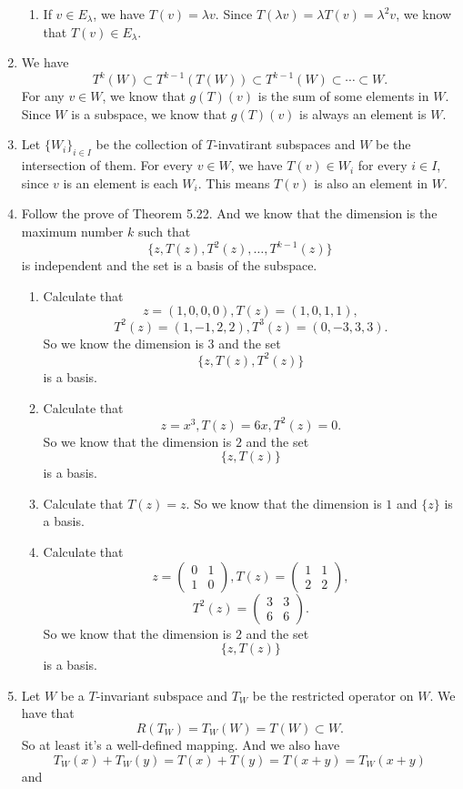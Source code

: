 \begin{enumerate}
\begin{enumerate}
\item If $v\in E_{\lambda}$, we have $T(v)=\lambda v$. Since $T(\lambda v)=\lambda T(v)=\lambda^2 v$, we know that $T(v)\in E_{\lambda}$.
\end{enumerate}
\item We have 
\[T^k(W)\subset T^{k-1}(T(W))\subset T^{k-1}(W)\subset \cdots \subset W.\]
For any $v\in W$, we know that $g(T)(v)$ is the sum of some elements in $W$. Since $W$ is a subspace, we know that $g(T)(v)$ is always an element is $W$.
\item Let $\{W_i\}_{i\in I}$ be the collection of $T$-invatirant subspaces and $W$ be the intersection of them. For every $v\in W$, we have $T(v)\in W_i$ for every $i\in I$, since $v$ is an element is each $W_i$. This means $T(v)$ is also an element in $W$.
\item Follow the prove of Theorem 5.22. And we know that the dimension is the maximum number $k$ such that 
\[\{z,T(z),T^2(z),\ldots ,T^{k-1}(z)\}\]
is independent and the set is a basis of the subspace.
\begin{enumerate}
\item Calculate that 
\[z=(1,0,0,0), T(z)=(1,0,1,1),\]
\[T^2(z)=(1,-1,2,2), T^3(z)=(0,-3,3,3).\]
So we know the dimension is $3$ and the set
\[\{z,T(z),T^2(z)\}\]
is a basis.
\item Calculate that
\[z=x^3,T(z)=6x,T^2(z)=0.\]
So we know that the dimension is $2$ and the set 
\[\{z,T(z)\}\]
is a basis.
\item Calculate that $T(z)=z$. So we know that the dimension is $1$ and $\{z\}$ is a basis.
\item Calculate that 
\[z=\begin{pmatrix}0&1\\1&0\end{pmatrix},T(z)=\begin{pmatrix}1&1\\2&2\end{pmatrix},\]
\[T^2(z)=\begin{pmatrix}3&3\\6&6\end{pmatrix}.\]
So we know that the dimension is $2$ and the set 
\[\{z,T(z)\}\]
is a basis.
\end{enumerate}
\item Let $W$ be a $T$-invariant subspace and $T_W$ be the restricted operator on $W$. We have that 
\[R(T_W)=T_W(W)=T(W)\subset W.\]
So at least it's a well-defined mapping. And we also have 
\[T_W(x)+T_W(y)=T(x)+T(y)=T(x+y)=T_W(x+y)\]
and 

\end{enumerate}

